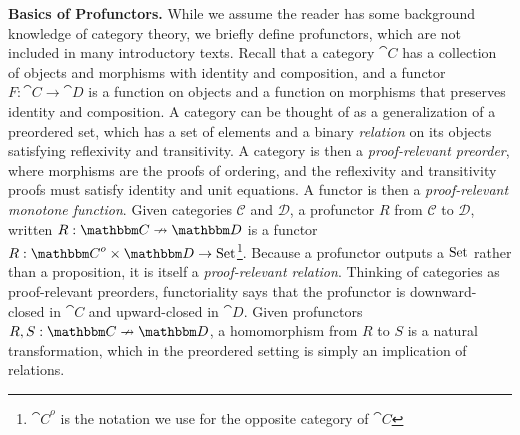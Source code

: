 \documentclass{llncs}
\begin{document}
\textbf{Basics of Profunctors.}  While we assume the reader has some
background knowledge of category theory, we briefly define profunctors,
which are not included in many introductory texts.  Recall that a
category $\cat C$ has a collection of objects and morphisms with
identity and composition, and a functor $F : \cat C \to \cat D$ is a
function on objects and a function on morphisms that preserves identity
and composition.  A category can be thought of as a generalization of a
preordered set, which has a set of elements and a binary \emph{relation}
on its objects satisfying reflexivity and transitivity.  A category is
then a \emph{proof-relevant preorder}, where morphisms are the proofs of
ordering, and the reflexivity and transitivity proofs must satisfy identity and
unit equations. A functor is then a \emph{proof-relevant monotone
  function}.  Given categories $\mathcal C$ and $\mathcal D$, a
profunctor $R$ from $\mathcal C$ to $\mathcal D$, written $R : \cat C
\pto \cat D$ is a functor $R : {\cat C}^{o} \times {\cat D} \to \Set$\footnote{${\cat C}^o$ is the notation we use for the opposite category of $\cat C$}.
Because a profunctor outputs a $\textrm{Set}$ rather than a proposition, it is
itself a \emph{proof-relevant relation}.  Thinking of categories as
proof-relevant preorders, functoriality says that the profunctor is
downward-closed in $\cat C$ and upward-closed in $\cat D$.  Given
profunctors $R, S : \cat C \pto \cat D$, a homomorphism from $R$ to $S$
is a natural transformation, which in the preordered setting is
simply an implication of relations.

\end{document}
